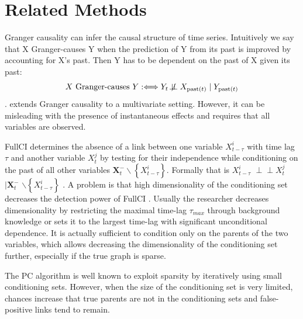 \documentclass[conference]{IEEEtran}
\begin{document}
\section{Related Methods}

Granger causality can infer the causal structure of time series. Intuitively we say that X Granger-causes Y when the prediction of Y from its past is improved by accounting for X's past.
Then Y has to be dependent on the past of X given its past:
\begin{equation}
X \text { Granger-causes } Y: \Longleftrightarrow Y_{t} \not\!\perp\!\!\!\perp X_{\operatorname{past}(t)}  \mid Y_{\operatorname{past}(t)}
\end{equation} \cite{peters_elements_2018}.
\cite{granger_testing_1980} extends Granger causality to a multivariate setting. However, it can be misleading with the presence of instantaneous effects \cite{granger_clive_recent_1988} and requires that all variables are observed\cite{granger_testing_1980}.

FullCI determines the absence of a link between one variable $X_{t-\tau}^{i}$ with time lag $\tau$ and another variable $X_{t}^{j}$ by testing for their independence while conditioning on the past of all other variables $\mathbf{X}_{t}^{-} \backslash\left\{X_{t-\tau}^{i}\right\}$. 
Formally that is
$X_{t-\tau}^{i} $
$\!\perp\!\!\!\perp X_{t}^{j} $
$\mid \mathbf{X}_{t}^{-}$
$ \backslash\left\{X_{t-\tau}^{i}\right\}$ \cite{runge_pcmci_2019}.
A problem is that high dimensionality of the conditioning set decreases the detection power of FullCI \cite{runge_pcmci_2019}.
Usually the researcher decreases dimensionality by restricting the maximal time-lag $\tau_{max}$ through background knowledge or sets it to the largest time-lag with significant unconditional dependence\cite{runge_pcmci_2019}.
It is actually sufficient to condition only on the parents of the two variables\cite{pearl_causality_2000}, which allows decreasing the dimensionality of the conditioning set further, especially if the true graph is sparse.

The PC algorithm is well known to exploit sparsity by iteratively using small conditioning sets\cite{runge_pcmci_2019}. However, when the size of the conditioning set is very limited, chances increase that true parents are not in the conditioning sets and false-positive links tend to remain\cite{runge_pcmci_2019}.
\end{document}
